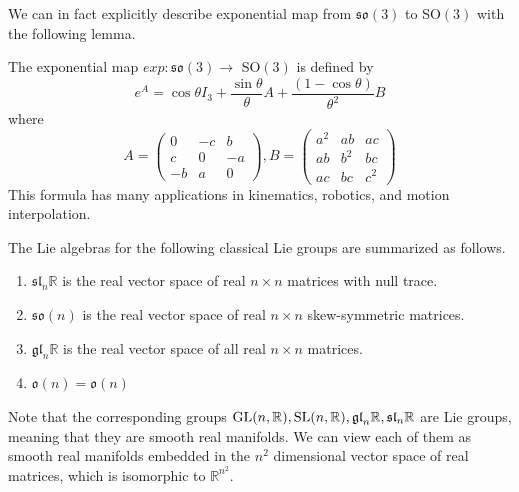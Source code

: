     We can in fact explicitly describe exponential map from $\mathfrak{so}(3)$ to SO$(3)$ with the following lemma. 

    \begin{lemma}
      The exponential map $exp: \mathfrak{so}(3) \rightarrow$ SO$(3)$ is defined by 
      \begin{equation}
        e^A = \cos{\theta} I_3 + \frac{\sin{\theta}}{\theta} A + \frac{(1 - \cos{\theta})}{\theta^2} B
      \end{equation}
      where 
      \begin{equation}
        A = \begin{pmatrix}
        0&-c&b\\c&0&-a\\-b&a&0
        \end{pmatrix}, B = \begin{pmatrix}
        a^2&ab&ac\\ab&b^2&bc\\ac&bc&c^2
        \end{pmatrix}
      \end{equation}
      This formula has many applications in kinematics, robotics, and motion interpolation. 
    \end{lemma}

    \begin{theorem}
    The Lie algebras for the following classical Lie groups are summarized as follows. 
    \begin{enumerate}
      \item $\mathfrak{sl}_n \mathbb{R}$ is the real vector space of real $n \times n$ matrices with null trace.
      \item $\mathfrak{so}(n)$ is the real vector space of real $n \times n$ skew-symmetric matrices. 
      \item $\mathfrak{gl}_n \mathbb{R}$ is the real vector space of all real $n \times n$ matrices.
      \item $\mathfrak{o}(n) = \mathfrak{o}(n)$
    \end{enumerate}
    \end{theorem}
    Note that the corresponding groups $\operatorname{GL}(n, \mathbb{R}), \operatorname{SL}(n, \mathbb{R}), \mathfrak{gl}_n \mathbb{R}, \mathfrak{sl}_n \mathbb{R}$ are Lie groups, meaning that they are smooth real manifolds. We can view each of them as smooth real manifolds embedded in the $n^2$ dimensional vector space of real matrices, which is isomorphic to $\mathbb{R}^{n^2}$. 

